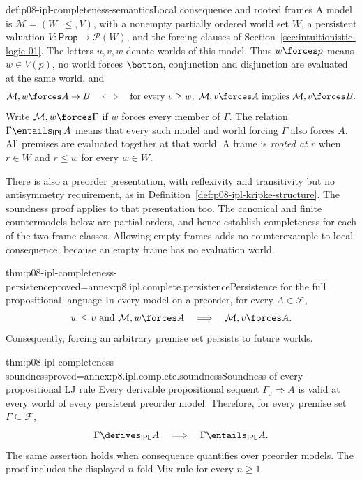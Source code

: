 \begin{hbdefinition}{def:p08-ipl-completeness-semantics}{Local consequence and rooted frames}
A model is \(\mathcal M=(W,\leq,V)\), with a nonempty partially ordered
world set \(W\), a persistent valuation
\(V:\mathsf{Prop}\to\mathcal P(W)\), and the forcing clauses of
Section~\ref{sec:intuitionistic-logic-01}. The letters \(u,v,w\) denote
worlds of this model. Thus \(w\forces p\) means
\(w\in V(p)\), no world forces \(\bottom\), conjunction and
disjunction are evaluated at the same world, and
\[
 \mathcal M,w\forces A\to B
 \quad\Longleftrightarrow\quad
 \text{for every }v\geq w,
 \ \mathcal M,v\forces A\text{ implies }\mathcal M,v\forces B.
\]
Write \(\mathcal M,w\forces\Gamma\) if \(w\) forces every member of
\(\Gamma\). The relation \(\Gamma\entails_{\mathsf{IPL}}A\) means
that every such model and world forcing \(\Gamma\) also forces \(A\).
All premises are evaluated together at that world. A frame is
\emph{rooted at \(r\)} when \(r\in W\) and \(r\leq w\) for every
\(w\in W\).

There is also a preorder presentation, with reflexivity and transitivity
but no antisymmetry requirement, as in
Definition~\ref{def:p08-ipl-kripke-structure}. The soundness proof applies
to that presentation too. The canonical and finite countermodels below
are partial orders, and hence establish completeness for each of the two
frame classes. Allowing empty frames adds no counterexample to local
consequence, because an empty frame has no evaluation world.
\end{hbdefinition}

\begin{hblemma}{thm:p08-ipl-completeness-persistence}{proved=annex:p8.ipl.complete.persistence}{Persistence for the full propositional language}
In every model on a preorder, for every \(A\in\mathcal F\),
\[
 w\leq v\text{ and }\mathcal M,w\forces A
 \quad\Longrightarrow\quad \mathcal M,v\forces A.
\]
Consequently, forcing an arbitrary premise set persists to future worlds.
\end{hblemma}

\begin{hbtheorem}{thm:p08-ipl-completeness-soundness}{proved=annex:p8.ipl.complete.soundness}{Soundness of every propositional LJ rule}
Every derivable propositional sequent \(\Gamma_0\Rightarrow A\) is
valid at every world of every persistent preorder model. Therefore, for
every premise set \(\Gamma\subseteq\mathcal F\),
\[
 \Gamma\derives_{\mathsf{IPL}}A
 \quad\Longrightarrow\quad \Gamma\entails_{\mathsf{IPL}}A.
\]
The same assertion holds when consequence quantifies over preorder models.
The proof includes the displayed \(n\)-fold Mix rule for every
\(n\geq1\).
\end{hbtheorem}

